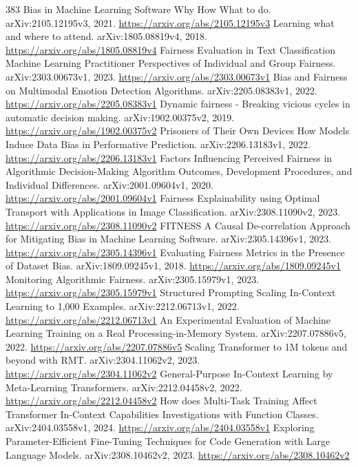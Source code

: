 \documentclass[11pt]{article}
\begin{document}
\begin{thebibliography}{383}
 Bias in Machine Learning Software Why How What to do. arXiv:2105.12195v3, 2021. \url{https://arxiv.org/abs/2105.12195v3}
 Learning what and where to attend. arXiv:1805.08819v4, 2018. \url{https://arxiv.org/abs/1805.08819v4}
 Fairness Evaluation in Text Classification Machine Learning Practitioner Perspectives of Individual and Group Fairness. arXiv:2303.00673v1, 2023. \url{https://arxiv.org/abs/2303.00673v1}
 Bias and Fairness on Multimodal Emotion Detection Algorithms. arXiv:2205.08383v1, 2022. \url{https://arxiv.org/abs/2205.08383v1}
 Dynamic fairness - Breaking vicious cycles in automatic decision making. arXiv:1902.00375v2, 2019. \url{https://arxiv.org/abs/1902.00375v2}
 Prisoners of Their Own Devices How Models Induce Data Bias in Performative Prediction. arXiv:2206.13183v1, 2022. \url{https://arxiv.org/abs/2206.13183v1}
 Factors Influencing Perceived Fairness in Algorithmic Decision-Making Algorithm Outcomes, Development Procedures, and Individual Differences. arXiv:2001.09604v1, 2020. \url{https://arxiv.org/abs/2001.09604v1}
 Fairness Explainability using Optimal Transport with Applications in Image Classification. arXiv:2308.11090v2, 2023. \url{https://arxiv.org/abs/2308.11090v2}
 FITNESS A Causal De-correlation Approach for Mitigating Bias in Machine Learning Software. arXiv:2305.14396v1, 2023. \url{https://arxiv.org/abs/2305.14396v1}
 Evaluating Fairness Metrics in the Presence of Dataset Bias. arXiv:1809.09245v1, 2018. \url{https://arxiv.org/abs/1809.09245v1}
 Monitoring Algorithmic Fairness. arXiv:2305.15979v1, 2023. \url{https://arxiv.org/abs/2305.15979v1}
 Structured Prompting Scaling In-Context Learning to 1,000 Examples. arXiv:2212.06713v1, 2022. \url{https://arxiv.org/abs/2212.06713v1}
 An Experimental Evaluation of Machine Learning Training on a Real Processing-in-Memory System. arXiv:2207.07886v5, 2022. \url{https://arxiv.org/abs/2207.07886v5}
 Scaling Transformer to 1M tokens and beyond with RMT. arXiv:2304.11062v2, 2023. \url{https://arxiv.org/abs/2304.11062v2}
 General-Purpose In-Context Learning by Meta-Learning Transformers. arXiv:2212.04458v2, 2022. \url{https://arxiv.org/abs/2212.04458v2}
 How does Multi-Task Training Affect Transformer In-Context Capabilities Investigations with Function Classes. arXiv:2404.03558v1, 2024. \url{https://arxiv.org/abs/2404.03558v1}
 Exploring Parameter-Efficient Fine-Tuning Techniques for Code Generation with Large Language Models. arXiv:2308.10462v2, 2023. \url{https://arxiv.org/abs/2308.10462v2}

\end{thebibliography}
\end{document}
